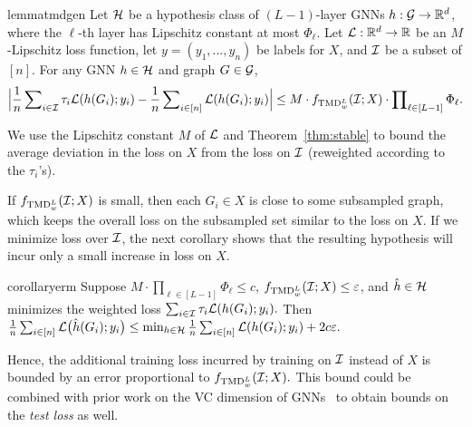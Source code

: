\begin{restatable}{lemma}{tmdgen}\label{lemma:tmd-gen} Let $\mathcal H$ be a hypothesis class of $(L-1)$-layer GNNs $h: \mathcal G \to \mathbb R^d$, where the $\ell$-th layer has Lipschitz constant at most $\Phi_\ell$. Let $\mathcal L: \mathbb R^d \to \mathbb R$ be an $M$-Lipschitz loss function, let {$y = (y_1, ..., y_n)$ be labels for $X$}, and $\mathcal I$ be a subset of $[n]$. For any GNN $h \in \mathcal H$ and graph $G \in \mathcal G$,  
\begin{align}
    \Big\lvert{\frac{1}{n} \sum\nolimits_{i \in \mathcal I} \tau_{i} \mathcal L(h(G_i); y_i) - \frac{1}{n}\sum\nolimits_{i \in [n]}\mathcal L(h(G_i); y_i)}\Big\rvert \nonumber \leq  M \cdot f_{\textnormal{TMD}_w^L}(\mathcal I; X) \cdot {\prod\nolimits_{\ell \in [L-1]} \Phi_\ell} . \label{eq:mediods_bound}
\end{align}
\end{restatable}
\begin{hproof} We use the Lipschitz constant $M$ of $\mathcal L$ and Theorem~\ref{thm:stable} to bound the average deviation in the loss on $X$ from the loss on $\mathcal I$ (reweighted according to the $\tau_i$'s). 
\end{hproof}

If $f_{\textnormal{TMD}_w^L}(\mathcal I; X)$ is small, then each $G_i \in X$ is close to some subsampled graph, which keeps the overall loss on the subsampled set similar to the loss on $X$. If we minimize loss over $\mathcal I$, the next corollary shows that the resulting hypothesis will incur only a small increase in loss on $X$.
\begin{restatable}{corollary}{erm}\label{cor:ERM}
    Suppose $M \cdot \prod_{\ell \in [L-1]} \Phi_\ell \leq c$, $f_{\textnormal{TMD}_w^L}(\mathcal I; X) \leq \varepsilon$, and $\hat{h} \in \mathcal H$ minimizes the weighted loss $\sum_{i \in \mathcal I} \tau_{i} \mathcal L(h(G_i); y_i).$ Then $
    \frac{1}{n}\sum\nolimits_{i \in [n]}\mathcal L\big(\hat{h}(G_i); y_i\big) \leq \min_{h \in \mathcal H}\frac{1}{n}\sum\nolimits_{i \in [n]}\mathcal L(h(G_i); y_i) + 2c\varepsilon.$
\end{restatable}
Hence, the additional training loss incurred by training on $\mathcal I$ instead of $X$ is bounded by an error proportional to $f_{\textnormal{TMD}_w^L}(\mathcal I; X).$ This bound could be combined with prior work on the VC dimension of GNNs~\citep[e.g.,][]{scarselli2018vapnik} to obtain bounds on the \emph{test loss} as well.

